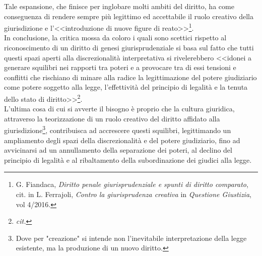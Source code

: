 Tale espansione, che finisce per inglobare molti ambiti del diritto, ha come conseguenza di rendere sempre più legittimo ed accettabile il ruolo creativo della giurisdizione e l’<<introduzione di nuove figure di reato>>\footnote{G. Fiandaca, \textit{Diritto penale giurisprudenziale e spunti di diritto comparato}, cit. in L. Ferrajoli, \textit{Contro la giurisprudenza creativa} in \textit{Questione Giustizia}, vol 4/2016.}.
\\In conclusione, la critica mossa da coloro i quali sono scettici rispetto al riconoscimento di un diritto di genesi giurisprudenziale si basa sul fatto che tutti questi spazi aperti alla discrezionalità interpretativa si rivelerebbero  <<idonei a generare squilibri nei rapporti tra poteri e a provocare tra di essi tensioni e conflitti che rischiano di minare alla radice la legittimazione del potere giudiziario come potere soggetto alla legge, l’effettività del principio di legalità e la tenuta dello stato di diritto>>\footnote{\textit{cit.}}. 
\\L’ultima cosa di cui si avverte il bisogno è proprio che la cultura giuridica, attraverso la teorizzazione di un ruolo creativo del diritto affidato alla giurisdizione\footnote{Dove per "creazione" si intende non l'inevitabile interpretazione della legge esistente, ma la produzione di un nuovo diritto.}, contribuisca ad accrescere questi squilibri, legittimando un ampliamento degli spazi della discrezionalità e del potere giudiziario, fino ad avvicinarsi ad un annullamento della separazione dei poteri, al declino del principio di legalità e al ribaltamento della subordinazione dei giudici alla legge.



